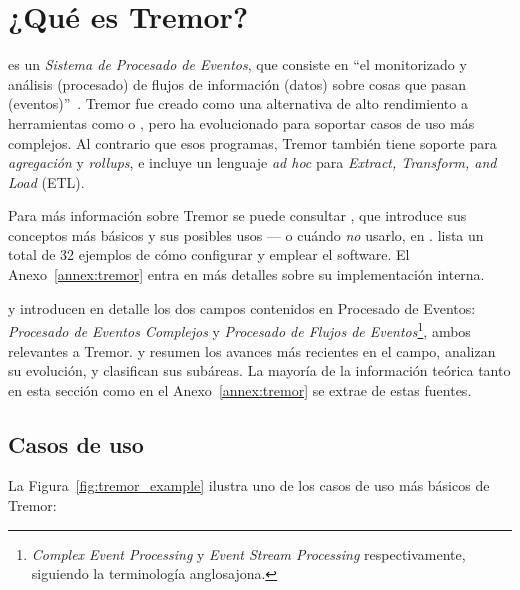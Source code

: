 \section{¿Qué es Tremor?}\label{sec:tremor}

 es un \emph{Sistema de Procesado de Eventos}, que consiste en
``el monitorizado y análisis (procesado) de flujos de información (datos) sobre
cosas que pasan (eventos)''~\cite{luckham2011event}. Tremor fue creado como una
alternativa de alto rendimiento a herramientas como  o
, pero ha evolucionado para soportar casos de uso más
complejos. Al contrario que esos programas, Tremor también tiene soporte para
\emph{agregación} y \emph{rollups}, e incluye un lenguaje \emph{ad hoc} para
\emph{Extract, Transform, and Load} (ETL).

Para más información sobre Tremor se puede consultar ,
que introduce sus conceptos más básicos y sus posibles usos --- o cuándo
\emph{no} usarlo, en . 
lista un total de 32 ejemplos de cómo configurar y emplear el software. El
Anexo~\ref{annex:tremor} entra en más detalles sobre su implementación interna.

\textcite{robins2010complex} y \textcite{cugola2012processing} introducen en
detalle los dos campos contenidos en Procesado de Eventos: \emph{Procesado de
Eventos Complejos} y \emph{Procesado de Flujos de
Eventos}\footnote{\emph{Complex Event Processing} y \emph{Event Stream
Processing} respectivamente, siguiendo la terminología anglosajona.}, ambos
relevantes a Tremor. \textcite{dayarathna2018recent} y
\textcite{tawsif2018review} resumen los avances más recientes en el campo,
analizan su evolución, y clasifican sus subáreas. La mayoría de la información
teórica tanto en esta sección como en el Anexo~\ref{annex:tremor} se extrae de
estas fuentes.

\subsection{Casos de uso}

La Figura~\ref{fig:tremor_example} ilustra uno de los casos de uso más básicos
de Tremor:

